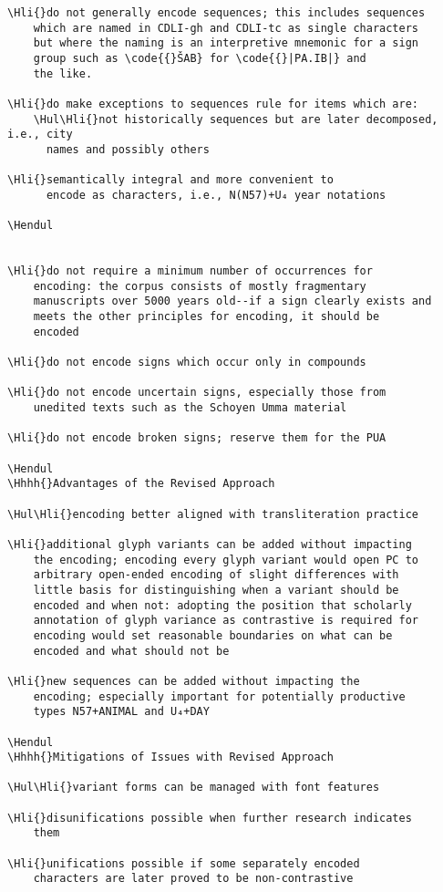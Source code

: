 \begin{verbatim}
\Hli{}do not generally encode sequences; this includes sequences
	which are named in CDLI-gh and CDLI-tc as single characters
	but where the naming is an interpretive mnemonic for a sign
	group such as \code{{}ŠAB} for \code{{}|PA.IB|} and
	the like.

\Hli{}do make exceptions to sequences rule for items which are:
	\Hul\Hli{}not historically sequences but are later decomposed, i.e., city
	  names and possibly others

\Hli{}semantically integral and more convenient to
	  encode as characters, i.e., N(N57)+U₄ year notations

\Hendul


\Hli{}do not require a minimum number of occurrences for
	encoding: the corpus consists of mostly fragmentary
	manuscripts over 5000 years old--if a sign clearly exists and
	meets the other principles for encoding, it should be
	encoded

\Hli{}do not encode signs which occur only in compounds

\Hli{}do not encode uncertain signs, especially those from
	unedited texts such as the Schoyen Umma material

\Hli{}do not encode broken signs; reserve them for the PUA

\Hendul
\Hhhh{}Advantages of the Revised Approach

\Hul\Hli{}encoding better aligned with transliteration practice

\Hli{}additional glyph variants can be added without impacting
	the encoding; encoding every glyph variant would open PC to
	arbitrary open-ended encoding of slight differences with
	little basis for distinguishing when a variant should be
	encoded and when not: adopting the position that scholarly
	annotation of glyph variance as contrastive is required for
	encoding would set reasonable boundaries on what can be
	encoded and what should not be

\Hli{}new sequences can be added without impacting the
 	encoding; especially important for potentially productive
 	types N57+ANIMAL and U₄+DAY

\Hendul
\Hhhh{}Mitigations of Issues with Revised Approach

\Hul\Hli{}variant forms can be managed with font features

\Hli{}disunifications possible when further research indicates
   	them

\Hli{}unifications possible if some separately encoded
	characters are later proved to be non-contrastive


\end{verbatim}
